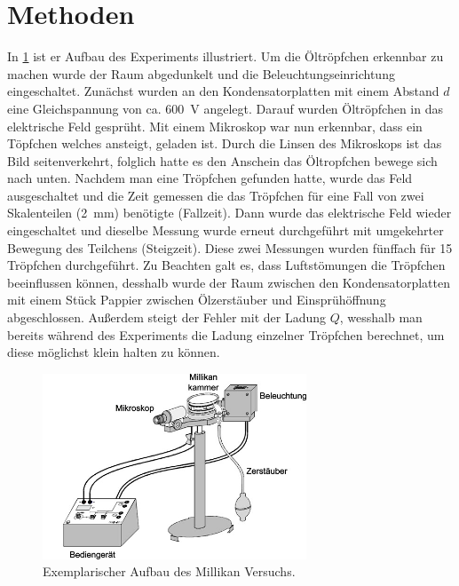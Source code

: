 \documentclass[
	a4paper,
	12pt,
	pagesize,
	ngerman
]{scrartcl}
\begin{document}
	\section{Methoden}
	In \cref{Millikan} ist er Aufbau des Experiments illustriert.
	Um die Öltröpfchen erkennbar zu machen wurde der Raum abgedunkelt und die Beleuchtungseinrichtung eingeschaltet.
	Zunächst wurden an den Kondensatorplatten mit einem Abstand $d$ eine Gleichspannung von ca. \SI{600}{V} angelegt. 
	Darauf wurden Öltröpfchen in das elektrische Feld gesprüht.
	Mit einem Mikroskop war nun erkennbar, dass ein Töpfchen welches ansteigt, geladen ist. 
	Durch die Linsen des Mikroskops ist das Bild seitenverkehrt, folglich hatte es den Anschein das Öltropfchen bewege sich nach unten. 
	Nachdem man eine Tröpfchen gefunden hatte, wurde das Feld ausgeschaltet und die Zeit gemessen die das Tröpfchen für eine Fall von zwei Skalenteilen (\SI{2}{mm}) benötigte (Fallzeit).
	Dann wurde das elektrische Feld wieder eingeschaltet und dieselbe Messung wurde erneut durchgeführt mit umgekehrter Bewegung des Teilchens (Steigzeit).
	Diese zwei Messungen wurden fünffach für 15 Tröpfchen durchgeführt. 
	Zu Beachten galt es, dass Luftstömungen die Tröpfchen beeinflussen können, desshalb wurde der Raum zwischen den Kondensatorplatten mit einem Stück Pappier zwischen Ölzerstäuber und Einsprühöffnung abgeschlossen.
	Außerdem steigt der Fehler mit der Ladung $Q$, wesshalb man bereits während des Experiments die Ladung einzelner Tröpfchen berechnet, um diese möglichst klein halten zu können.


	\begin{figure}[H]
		\includegraphics[width=0.7\textwidth]{Millikan}
		\centering
		\caption{Exemplarischer Aufbau des Millikan Versuchs.\cite{TUM} }
		\label{Millikan}
		\centering
	\end{figure} 
\end{document}
